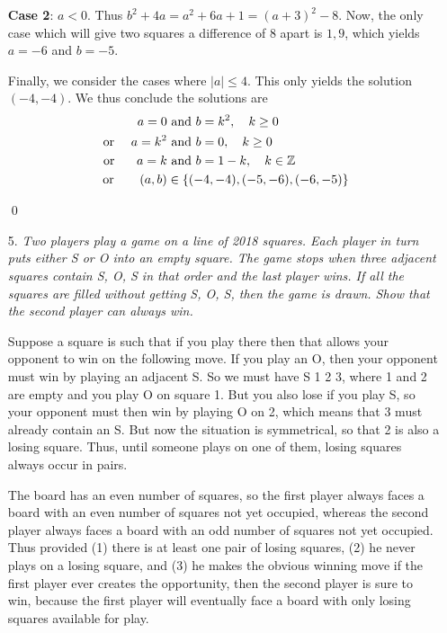 \documentclass[a4paper, 12pt]{article}
\begin{document}
\begin{enumerate}
\textbf{Case 2}: $a < 0$. Thus $b^2 + 4a = a^2 + 6a + 1 = (a + 3)^2 - 8$. Now, the only case which will give two squares a difference of 8 apart is $1, 9$, which yields $a = -6$ and $b = -5$.

Finally, we consider the cases where $|a| \leq 4$. This only yields the solution $(-4, -4)$. We thus conclude the solutions are
\begin{align*}
    a = 0 &\textrm{ and } b = k^2, \quad k \geq 0 \\
    \textrm{ or } \quad a = k^2 &\textrm{ and } b = 0, \quad k \geq 0 \\
    \textrm{ or } \quad \hspace{1.5mm} a = k &\textrm{ and } b = 1-k, \quad k \in \mathbb{Z} \\
    \textrm{ or } \quad \hspace{2.5mm} (a, b) &\in \{(-4, -4), (-5, -6), (-6, -5) \}
\end{align*}

\qed


\vspace{5mm}

\item[5.]   \textit{Two players play a game on a line of 2018 squares. Each player in turn puts either S or O into an empty square. The game stops when three adjacent squares contain S, O, S in that order and the last player wins. If all the squares are filled without getting S, O, S, then the game is drawn. Show that the second player can always win.}

 Suppose a square is such that if you play there then that allows your opponent to win on the following move. If you play an O, then your opponent must win by playing an adjacent S. So we must have S 1 2 3, where 1 and 2 are empty and you play O on square 1. But you also lose if you play S, so your opponent must then win by playing O on 2, which means that 3 must already contain an S. But now the situation is symmetrical, so that 2 is also a losing square. Thus, until someone plays on one of them, losing squares always occur in pairs.

The board has an even number of squares, so the first player always faces a board with an even number of squares not yet occupied, whereas the second player always faces a board with an odd number of squares not yet occupied. Thus provided (1) there is at least one pair of losing squares, (2) he never plays on a losing square, and (3) he makes the obvious winning move if the first player ever creates the opportunity, then the second player is sure to win, because the first player will eventually face a board with only losing squares available for play. \\


\end{enumerate}
\end{document}
